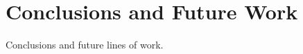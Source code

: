 \chapter{Conclusions and Future Work}
\label{cap:conclusions}

Conclusions and future lines of work.


